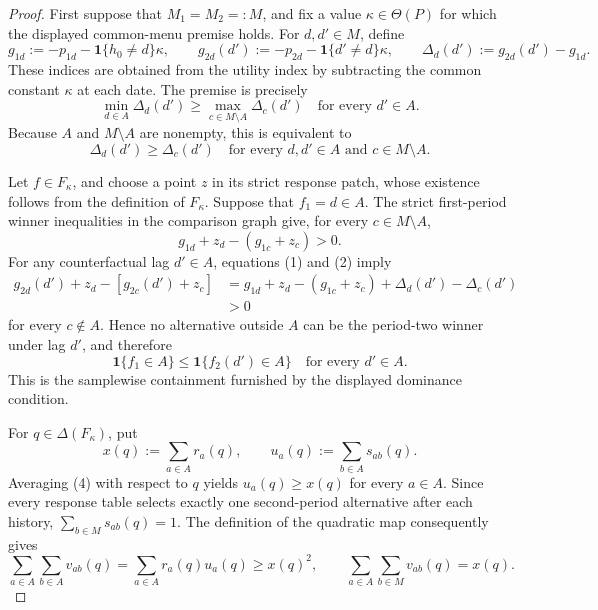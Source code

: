 \documentclass{article}
\begin{document}
\begin{proof}
First suppose that \(M_1=M_2=:M\), and fix a value \(\kappa\in\Theta(P)\) for which the displayed common-menu premise holds.  For \(d,d'\in M\), define
\[
 g_{1d}:=-p_{1d}-\mathbf 1\{h_0\ne d\}\kappa,
 \qquad
 g_{2d}(d'):=-p_{2d}-\mathbf 1\{d'\ne d\}\kappa,
 \qquad
 \Delta_d(d'):=g_{2d}(d')-g_{1d}.
\]
These indices are obtained from the utility index by subtracting the common constant \(\kappa\) at each date.  The premise is precisely
\[
 \min_{d\in A}\Delta_d(d')\ge
 \max_{c\in M\setminus A}\Delta_c(d')
 \quad\text{for every }d'\in A.
\]
Because \(A\) and \(M\setminus A\) are nonempty, this is equivalent to
\[
 \Delta_d(d')\ge \Delta_c(d')
 \quad
 \text{for every }d,d'\in A\text{ and }c\in M\setminus A.
\tag{1}
\]

Let \(f\in F_\kappa\), and choose a point \(z\) in its strict response patch, whose existence follows from the definition of \(F_\kappa\).  Suppose that \(f_1=d\in A\).  The strict first-period winner inequalities in the comparison graph give, for every \(c\in M\setminus A\),
\[
 g_{1d}+z_d-(g_{1c}+z_c)>0.
\tag{2}
\]
For any counterfactual lag \(d'\in A\), equations (1) and (2) imply
\[
 \begin{aligned}
 g_{2d}(d')+z_d-[g_{2c}(d')+z_c]
 &=g_{1d}+z_d-(g_{1c}+z_c)
   +\Delta_d(d')-\Delta_c(d')\\
 &>0
 \end{aligned}
\tag{3}
\]
for every \(c\notin A\).  Hence no alternative outside \(A\) can be the period-two winner under lag \(d'\), and therefore
\[
 \mathbf 1\{f_1\in A\}\le \mathbf 1\{f_2(d')\in A\}
 \quad\text{for every }d'\in A.
\tag{4}
\]
This is the samplewise containment furnished by the displayed dominance condition.

For \(q\in\Delta(F_\kappa)\), put
\[
 x(q):=\sum_{a\in A}r_a(q),
 \qquad
 u_a(q):=\sum_{b\in A}s_{ab}(q).
\]
Averaging (4) with respect to \(q\) yields \(u_a(q)\ge x(q)\) for every \(a\in A\).  Since every response table selects exactly one second-period alternative after each history,
\(\sum_{b\in M}s_{ab}(q)=1\).  The definition of the quadratic map consequently gives
\[
 \sum_{a\in A}\sum_{b\in A}v_{ab}(q)
 =\sum_{a\in A}r_a(q)u_a(q)
 \ge x(q)^2,
 \qquad
 \sum_{a\in A}\sum_{b\in M}v_{ab}(q)=x(q).
\tag{5}
\]


\end{proof}
\end{document}
